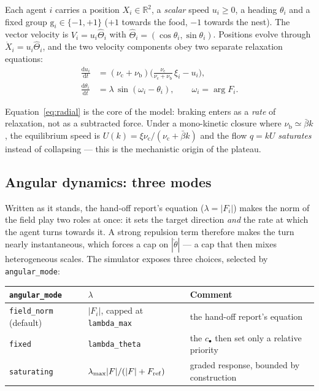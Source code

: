 \documentclass[11pt,a4paper]{article}
\newcommand{\dir}{\widehat{\Theta}}
\newcommand{\cruise}{\mathrm{c}}
\newcommand{\brake}{\mathrm{b}}
\newcommand{\code}[1]{\texttt{#1}}
\begin{document}
Each agent $i$ carries a position $X_i\in\mathbb R^2$, a \emph{scalar} speed
$u_i\geq0$, a heading $\theta_i$ and a fixed group
$\mathrm g_i\in\{-1,+1\}$ ($+1$ towards the food, $-1$ towards the nest). The
vector velocity is $V_i = u_i\dir_i$ with $\dir_i = (\cos\theta_i,\sin\theta_i)$.
Positions evolve through $\dot X_i = u_i \dir_i$, and the two velocity
components obey two separate relaxation equations:
\begin{align}
\frac{\mathrm du_i}{\mathrm dt}
  &= (\nu_\cruise+\nu_\brake)\Big(\tfrac{\nu_\cruise}{\nu_\cruise+\nu_\brake}\,\xi_i-u_i\Big),
  \label{eq:radial}\\[2pt]
\frac{\mathrm d\theta_i}{\mathrm dt} &= \lambda\,\sin(\omega_i-\theta_i),
  \qquad \omega_i=\arg F_i .
  \label{eq:angular}
\end{align}

Equation~\eqref{eq:radial} is the core of the model: braking enters as a
\emph{rate} of relaxation, not as a subtracted force. Under a mono-kinetic
closure where $\nu_\brake \simeq \bar\beta k$, the equilibrium speed is
$U(k)=\xi\nu_\cruise/(\nu_\cruise+\bar\beta k)$ and the flow $q=kU$
\emph{saturates} instead of collapsing --- this is the mechanistic origin of the
plateau.

\subsection{Angular dynamics: three modes}\label{sec:angular}

Written as it stands, the hand-off report's equation ($\lambda = |F_i|$) makes
the norm of the field play two roles at once: it sets the target direction
\emph{and} the rate at which the agent turns towards it. A strong repulsion term
therefore makes the turn nearly instantaneous, which forces a cap on
$|\dot\theta|$ --- a cap that then mixes heterogeneous scales. The simulator
exposes three choices, selected by \code{angular\_mode}:

\begin{center}
\begin{tabular}{@{}lll@{}}
\toprule
\code{angular\_mode} & $\lambda$ & Comment \\
\midrule
\code{field\_norm} (default) & $|F_i|$, capped at \code{lambda\_max} & the hand-off report's equation \\
\code{fixed} & \code{lambda\_theta} & the $c_\bullet$ then set only a relative priority \\
\code{saturating} & $\lambda_{\max}|F|/(|F|+F_{\rm ref})$ & graded response, bounded by construction \\
\bottomrule
\end{tabular}
\end{center}
\end{document}
